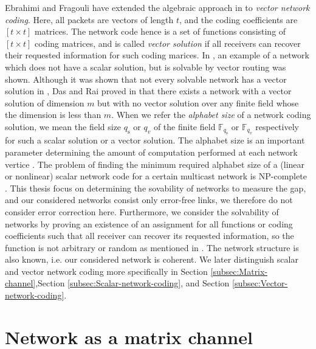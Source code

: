 Ebrahimi and Fragouli \cite{Ebrahimi:2011} have extended the algebraic
approach in \cite{Koetter:2003} to \textit{vector network coding}.
Here, all packets are vectors of length $t$, and the coding coefficients
are $\left[t\times t\right]$ matrices. The network code hence is
a set of functions consisting of $\left[t\times t\right]$ coding
matrices, and is called \textit{vector solution} if all receivers
can recover their requested information for such coding marices. In
\cite{Medard:2003}, an example of a network which does not have a
scalar solution, but is solvable by vector routing was shown. Although
it was shown that not every solvable network has a vector solution
in \cite[Lemma II.2]{Dougherty:2005}, Das and Rai proved in \cite{Das:2016}
that there exists a network with a vector solution of dimension $m$
but with no vector solution over any finite field whose the dimension
is less than $m$. When we refer the \textit{alphabet size} of a network
coding solution, we mean the field size $q_{\mathrm{s}}$ or $q_{v}$
of the finite field $\ensuremath{\mathbb{F}}_{q_{\mathrm{s}}}$ or
$\ensuremath{\mathbb{F}}_{q_{v}}$ respectively for such a scalar
solution or a vector solution. The alphabet size is an important parameter
determining the amount of computation performed at each network vertice
\cite{Wachter-Zeh:2018}. The problem of finding the minimum required
alphabet size of a (linear or nonlinear) scalar network code for a
certain multicast network is NP-complete \cite{Langberg:2009,Lehman:2004}.
This thesis focus on determining the sovability of networks to measure
the gap, and our considered networks consist only error-free links,
we therefore do not consider error correction here. Furthermore, we
consider the solvability of networks by proving an existence of an
assignment for all functions or coding coefficients such that all
receiver can recover its requested information, so the function is
not arbitrary or random as mentioned in \cite{Ho:2003,Ahlswede:2000}.
The network structure is also known, i.e. our considered network is
coherent. We later distinguish scalar and vector network coding more
specifically in Section \ref{subsec:Matrix-channel},Section \ref{subsec:Scalar-network-coding},
and Section \ref{subsec:Vector-network-coding}.

\section{Network as a matrix channel \label{subsec:Matrix-channel}}

